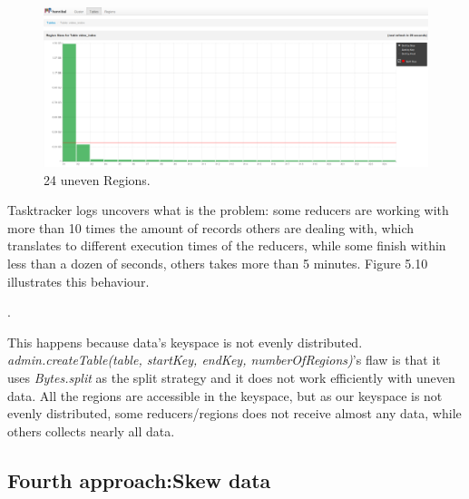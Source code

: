 \begin{figure}[htb]
\centering
\includegraphics[width=1\textwidth]{./images/24regions.png}
\caption{24 uneven Regions.} \label{fig:oneRegion}
\end{figure}

Tasktracker logs uncovers what is the problem: some reducers are working with more than 10 times the amount of records others are dealing with, which translates to different execution times of the reducers, while some finish within less than a dozen of seconds, others takes more than 5 minutes. Figure 5.10 illustrates this behaviour.

\bigskip 

 . 

\bigskip

This happens because data's keyspace is not evenly distributed. \textit{admin.createTable(table, startKey, endKey, numberOfRegions)}'s flaw is that it uses \textit{Bytes.split} as the split strategy and it does not work efficiently with uneven data. All the regions are accessible in the keyspace, but as our keyspace is not evenly distributed, some reducers/regions does not receive almost any data, while others collects nearly all data.



\subsection{Fourth approach:Skew data}

